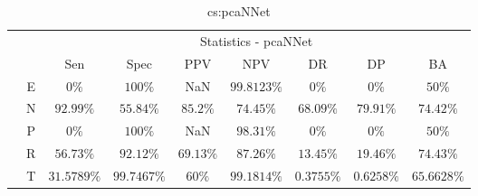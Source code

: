 \begin{table}[!ht]
	\centering
	\begin{tabular}{|c|c|c|c|c|c|c|c|c|}
		\cline{3-9}
		\multicolumn{2}{c|}{} & \multicolumn{7}{c|}{Statistics - pcaNNet} \\ \cline{3-9}
		\multicolumn{2}{c|}{} & Sen & Spec & PPV & NPV & DR & DP & BA \\ \hline
		\multirow{5}{*}{\rotatebox{90}{Class}} & E & $0\%$ & $100\%$ & NaN & $99.8123\%$ & $0\%$ & $0\%$ & $50\%$ \\ \cline{2-9}
		 & N & $92.99\%$ & $55.84\%$ & $85.2\%$ & $74.45\%$ & $68.09\%$ & $79.91\%$ & $74.42\%$ \\ \cline{2-9}
		 & P & $0\%$ & $100\%$ & NaN & $98.31\%$ & $0\%$ & $0\%$ & $50\%$ \\ \cline{2-9}
		 & R & $56.73\%$ & $92.12\%$ & $69.13\%$ & $87.26\%$ & $13.45\%$ & $19.46\%$ & $74.43\%$ \\ \cline{2-9}
		 & T & $31.5789\%$ & $99.7467\%$ & $60\%$ & $99.1814\%$ & $0.3755\%$ & $0.6258\%$ & $65.6628\%$ \\ \hline
	\end{tabular}
	\caption{cs:pcaNNet}
	\label{tab:cs:pcaNNet}
\end{table}
